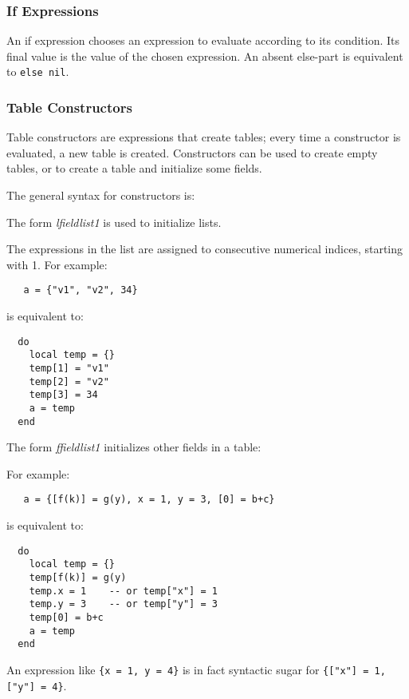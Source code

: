 \documentclass[11pt]{article}
\newcommand{\Index}[1]{#1\index{#1}}
\begin{document}
\subsubsection{If Expressions}
\begin{Produc}
\end{Produc}%
An \Index{if expression} chooses an expression to evaluate
according to its condition.
Its final value is the value of the chosen expression.
An absent else-part is equivalent to \verb|else nil|.

\subsubsection{Table Constructors} \label{tableconstructor}
Table \Index{constructors} are expressions that create tables;
every time a constructor is evaluated, a new table is created.
Constructors can be used to create empty tables,
or to create a table and initialize some fields.

The general syntax for constructors is:
\begin{Produc}
\end{Produc}

The form \emph{lfieldlist1} is used to initialize lists.
\begin{Produc}
\end{Produc}%
The expressions in the list are assigned to consecutive numerical indices,
starting with 1.
For example:
\begin{verbatim}
   a = {"v1", "v2", 34}
\end{verbatim}
is equivalent to:
\begin{verbatim}
  do
    local temp = {}
    temp[1] = "v1"
    temp[2] = "v2"
    temp[3] = 34
    a = temp
  end
\end{verbatim}

The form \emph{ffieldlist1} initializes other fields in a table:
\begin{Produc}
\end{Produc}%
For example:
\begin{verbatim}
   a = {[f(k)] = g(y), x = 1, y = 3, [0] = b+c}
\end{verbatim}
is equivalent to:
\begin{verbatim}
  do
    local temp = {}
    temp[f(k)] = g(y)
    temp.x = 1    -- or temp["x"] = 1
    temp.y = 3    -- or temp["y"] = 3
    temp[0] = b+c
    a = temp
  end
\end{verbatim}
An expression like \verb|{x = 1, y = 4}| is
in fact syntactic sugar for \verb|{["x"] = 1, ["y"] = 4}|.
\end{document}
